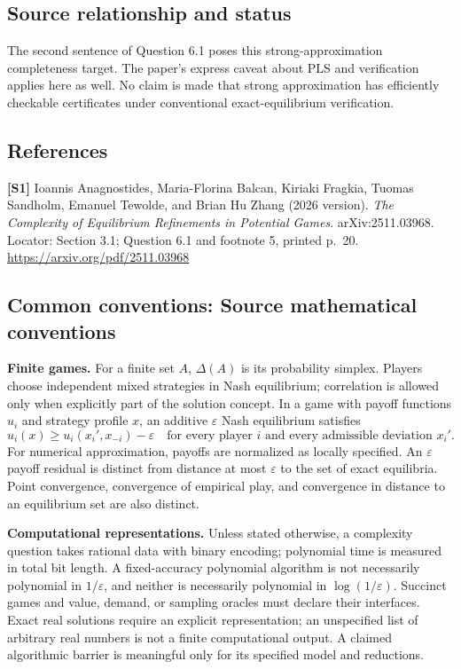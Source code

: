 \documentclass[11pt,a4paper]{article}
\begin{document}
\subsection*{Source relationship and status}
The second sentence of Question 6.1 poses this strong-approximation completeness target. The paper's express caveat about PLS and verification applies here as well. No claim is made that strong approximation has efficiently checkable certificates under conventional exact-equilibrium verification.
\subsection*{References}
\begingroup\footnotesize\raggedright
{\footnotesize\raggedright
\textbf{[S1]} Ioannis Anagnostides, Maria-Florina Balcan, Kiriaki Fragkia, Tuomas Sandholm, Emanuel Tewolde, and Brian Hu Zhang (2026 version). \emph{The Complexity of Equilibrium Refinements in Potential Games}. arXiv:2511.03968. Locator: Section 3.1; Question 6.1 and footnote 5, printed p.\ 20. \url{https://arxiv.org/pdf/2511.03968}\par}
\par\endgroup

\subsection*{Common conventions: Source mathematical conventions}

\textbf{Finite games.} For a finite set $A$, $\Delta(A)$ is its probability
simplex. Players choose independent mixed strategies in Nash equilibrium;
correlation is allowed only when explicitly part of the solution concept.
In a game with payoff functions $u_i$ and strategy profile $x$, an additive
$\varepsilon$ Nash equilibrium satisfies
\[
 u_i(x)\geq u_i(x_i',x_{-i})-\varepsilon
 \quad\text{for every player $i$ and every admissible deviation $x_i'$}.
\]
For numerical approximation, payoffs are normalized as locally specified.
An $\varepsilon$ payoff residual is distinct from distance at most
$\varepsilon$ to the set of exact equilibria. Point convergence, convergence
of empirical play, and convergence in distance to an equilibrium set are
also distinct.

\textbf{Computational representations.} Unless stated otherwise, a complexity
question takes rational data with binary encoding; polynomial time is measured
in total bit length. A fixed-accuracy polynomial algorithm is not necessarily
polynomial in $1/\varepsilon$, and neither is necessarily polynomial in
$\log(1/\varepsilon)$. Succinct games and value, demand, or sampling oracles
must declare their interfaces. Exact real solutions require an explicit
representation; an unspecified list of arbitrary real numbers is not a
finite computational output. A claimed algorithmic barrier is meaningful
only for its specified model and reductions.
\end{document}
